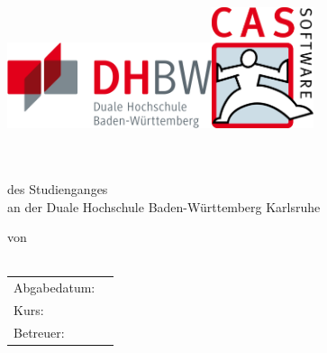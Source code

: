 
\newcommand{\logodhbw}{\includegraphics[width=6cm]{kapitel/0_offizielles/img/dhbw}}
\newcommand{\logocas}{\includegraphics[width=3cm]{kapitel/0_offizielles/img/cas}}

\begin{titlepage}
	\sffamily
	
	\logodhbw \hfill \logocas \\[2ex]
	
	\begin{center}
		\huge{\textsc{\textbf{\theTitle}}}
		\\[6ex]
		\Large{\textbf{\theSubtitle}}
		\\
		\Large{des Studienganges \studiengang}
		\\
		\Large{an der Duale Hochschule Baden-Württemberg Karlsruhe}
		\\[7ex]
		
		\normalsize{
			von
			\\
			\theAuthor
			\\[15ex]
			
			\begin{tabular}{ll}
				Abgabedatum:		& \quad \deadline \\
				Kurs:				& \quad \kurs \\ 
				Betreuer:			& \quad \supervisor \\
			\end{tabular}
		}
	\end{center}
\end{titlepage}